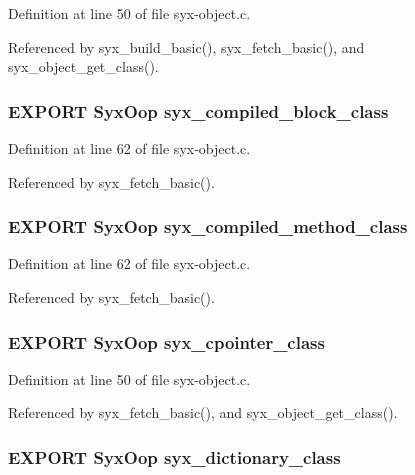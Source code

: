 Definition at line 50 of file syx-object.c.

Referenced by syx\_\-build\_\-basic(), syx\_\-fetch\_\-basic(), and syx\_\-object\_\-get\_\-class().\hypertarget{syx-object_8h_6b5b733fa1150efc8b27835298b58087}{
\subsubsection{\setlength{\rightskip}{0pt plus 5cm}EXPORT {\bf SyxOop} {\bf syx\_\-compiled\_\-block\_\-class}}}
\label{syx-object_8h_6b5b733fa1150efc8b27835298b58087}




Definition at line 62 of file syx-object.c.

Referenced by syx\_\-fetch\_\-basic().\hypertarget{syx-object_8h_e73b435f28f6326845c790d616f0763f}{
\subsubsection{\setlength{\rightskip}{0pt plus 5cm}EXPORT {\bf SyxOop} {\bf syx\_\-compiled\_\-method\_\-class}}}
\label{syx-object_8h_e73b435f28f6326845c790d616f0763f}




Definition at line 62 of file syx-object.c.

Referenced by syx\_\-fetch\_\-basic().\hypertarget{syx-object_8h_ae4d22bf2cfb62dc988be9f421e97aee}{
\subsubsection{\setlength{\rightskip}{0pt plus 5cm}EXPORT {\bf SyxOop} {\bf syx\_\-cpointer\_\-class}}}
\label{syx-object_8h_ae4d22bf2cfb62dc988be9f421e97aee}




Definition at line 50 of file syx-object.c.

Referenced by syx\_\-fetch\_\-basic(), and syx\_\-object\_\-get\_\-class().\hypertarget{syx-object_8h_fe9b69c223c0ab9ddb51d1f49b58dd96}{
\subsubsection{\setlength{\rightskip}{0pt plus 5cm}EXPORT {\bf SyxOop} {\bf syx\_\-dictionary\_\-class}}}
\label{syx-object_8h_fe9b69c223c0ab9ddb51d1f49b58dd96}




